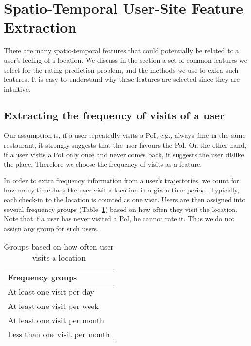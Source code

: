 \section{Spatio-Temporal User-Site Feature Extraction}
\label{sec:method}

There are many spatio-temporal features that could potentially be related to a user's feeling of a location. We discuss in the section a set of common features we select for the rating prediction problem, and the methods we use to extra such features. It is easy to understand why these features are selected since they are intuitive.

\subsection{Extracting the frequency of visits of a user}

Our assumption is, if a user repeatedly visits a PoI, e.g., always dine in the same restaurant, it strongly suggests that the user favours the PoI. On the other hand, if a user visits a PoI only once and never comes back, it suggests the user dislike the place. Therefore we choose the frequency of visits as a feature.

In order to extra frequency information from a user's trajectories, we count for how many time does the user visit a location in a given time period. Typically, each check-in to the location is counted as one visit. Users are then assigned into several frequency groups (Table~\ref{frequencyGroups}) based on how often they visit the location. Note that if a user has never visited a PoI, he cannot rate it. Thus we do not assign any group for such users.

\begin{table}[htbp]
\begin{center}
\caption{Groups based on how often user visits a location \label{frequencyGroups}}
\begin{tabular}{|l|} \hline
\textbf{Frequency groups} \\ \hline
At least one visit per day \\ \hline
At least one visit per week \\ \hline
At least one visit per month \\ \hline
Less than one visit per month \\ \hline
\end{tabular}
\end{center}
\end{table}

